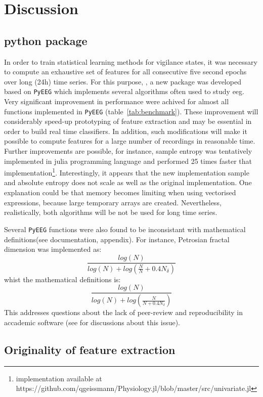 \section{Discussion} \label{discussion}

\subsection{python package}
 
In order to train statistical learning methods for vigilance states, 
it was necessary to compute an exhaustive set of features for all consecutive five second epochs
over long (24h) time series.
For this purpose, \pr{}, a new \py{} package was developed based on
\texttt{PyEEG}\citationneeded{} which implements several algorithms often used to study \gls{eeg}.
Very significant improvement in performance were achived for almost all functions implemented in \texttt{PyEEG}
(table~\ref{tab:benchmark}). These improvement will considerably speed-up prototyping of feature extraction
and may be essential in order to build real time classifiers. 
In addition, such modifications will make it possible to compute features for a large number
of recordings in reasonable time.
Further improvements are possible, for instance, 
sample entropy was tentatively implemented in julia programming language and performed 25 times faster that
\pr{} implementation\footnote{implementation available at 
https://github.com/qgeissmann/Physiology.jl/blob/master/src/univariate.jl}.
Interestingly, it appears that the new implementation sample and 
absolute entropy does not scale as well as the original implementation.
One explanation could be that memory becomes limiting when using vectorised expressions, because large temporary arrays are created.
Nevertheless, realistically, both algorithms will be not be used for long time series.

Several \texttt{PyEEG} functions were also found to be inconsistant with mathematical
definitions(see \pr{} documentation, appendix).
For instance, Petrosian fractal dimension \citationneeded{} was implemented as:
\[
\frac{log(N)}{log(N) + log(\frac{N}{N}+0.4N_{\delta})}
\]
whist the mathematical definitions is:
\[
\frac{log(N)}{log(N) + log(\frac{N}{N+0.4N_{\delta}})}
\]
This addresses questions about the lack of peer-review and reproducibility in accademic software (see  for discussions about this issue).

\subsection{Originality of feature extraction} 

